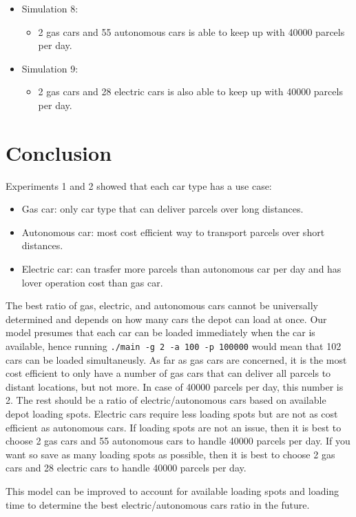 \documentclass[a4paper, 11pt, a4paper]{article}
\begin{document}
\begin{itemize}
\begin{itemize}
    \end{itemize}
    \item Simulation 8:
    \begin{itemize}
        \item 2 gas cars and 55 autonomous cars is able to keep up with
        40000 parcels per day.
    \end{itemize}
    \item Simulation 9:
    \begin{itemize}
        \item 2 gas cars and 28 electric cars is also able to keep up with
        40000 parcels per day.
    \end{itemize}
\end{itemize}

\section{Conclusion}

Experiments 1 and 2 showed that each car type has a use case:
\begin{itemize}
    \item Gas car: only car type that can deliver parcels over long distances.
    \item Autonomous car: most cost efficient way to transport parcels over
    short distances.
    \item Electric car: can trasfer more parcels than autonomous car per day and
    has lover operation cost than gas car.
\end{itemize}

The best ratio of gas, electric, and autonomous cars cannot be
universally determined and depends on how many cars the depot can load at once.
Our model presumes that each car can be loaded immediately when the car is
available, hence running \verb|./main -g 2 -a 100 -p 100000| would mean that 102
cars can be loaded simultaneusly. As far as gas cars are concerned, it is the
most cost efficient to only have a number of gas cars that can deliver all
parcels to distant locations, but not more. In case of 40000 parcels per day,
this number is 2. The rest should be a ratio of
electric/autonomous cars based on available depot loading spots. Electric cars
require less loading spots but are not as cost efficient as autonomous cars. If
loading spots are not an issue, then it is best to choose 2 gas cars and 55
autonomous cars to handle 40000 parcels per day. If you want so save as many
loading spots as possible, then it is best to choose 2 gas cars and 28 electric
cars to handle 40000 parcels per day.

This model can be improved to account for available loading spots and loading
time to determine the best electric/autonomous cars ratio in the future.

\newpage


\renewcommand{\refname}{Sources}

\end{document}
